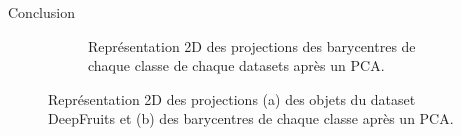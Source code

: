 \begin{subsectionframemod}{Conclusion}
\begin{figure}[!t]
\begin{subfigure}[b]{0.49\textwidth}
         \caption{Représentation 2D des projections des barycentres de chaque classe de chaque datasets après un PCA.}
         \label{fig:2dclass}
    \end{subfigure}
    \caption{Représentation 2D des projections  (a) des objets du dataset DeepFruits et (b) des barycentres de chaque classe après un PCA.}
    \label{fig:class-representation}
\end{figure}
\end{subsectionframemod}


